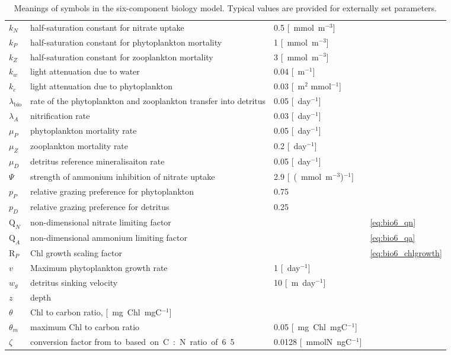 \begin{table}[ht]
\begin{tabular}{lp{8cm}p{5cm}l}
    $k_N$ & half-saturation constant for nitrate uptake & 0.5 \unit[mmol m$^{-3}$]  & \\
    $k_P$ & half-saturation constant for phytoplankton mortality & 1 \unit[mmol m$^{-3}$]  & \\
    $k_Z$ & half-saturation constant for zooplankton mortality & 3 \unit[mmol m$^{-3}$]  & \\
    $k_w$ & light attenuation due to water & 0.04 \unit[m$^{-1}$] & \\ 
    $k_c$ & light attenuation due to phytoplankton & 0.03 \unit[m$^2$ mmol$^{-1}$] & \\ 
    $\lambda_{\mathrm{bio}}$ & rate of the phytoplankton and zooplankton transfer into detritus & 0.05 \unit[day$^{-1}$]& \\
    $\lambda_A$ & nitrification rate  & 0.03 \unit[day$^{-1}$]& \\
    $\mu_P$ & phytoplankton mortality rate & 0.05 \unit[day$^{-1}$] & \\
    $\mu_Z$ & zooplankton mortality rate & 0.2 \unit[day$^{-1}$] & \\
    $\mu_D$ & detritus reference mineralisaiton rate & 0.05 \unit[day$^{-1}$] & \\
    $\Psi$ & strength of ammonium inhibition of nitrate uptake & 2.9 \unit[(mmol m$^{-3}$)$^{-1}$] & \\
    $p_P$ & relative grazing preference for phytoplankton & 0.75 & \\
    $p_D$ & relative grazing preference for detritus & 0.25 & \\
    $\mathrm{Q}_N$ & non-dimensional nitrate limiting factor && \eqref{eq:bio6_qn}  \\
    $\mathrm{Q}_A$ & non-dimensional ammonium limiting factor && \eqref{eq:bio6_qa}  \\
    $\mathrm{R}_P$ & Chl growth scaling factor && \eqref{eq:bio6_chlgrowth} \\
    $v$ & Maximum phytoplankton growth rate & 1 \unit[day$^{-1}$] & \\
    $w_g$ & detritus sinking velocity & 10 \unit[m day$^{-1}$]& \\
    $z$ & depth && \\
    $\theta$ & Chl to carbon ratio, \unit[mg Chl mgC$^{-1}$] && \\
    $\theta_m$ & maximum Chl to carbon ratio & 0.05 \unit[mg Chl mgC$^{-1}$] &\\
    $\zeta$ & conversion factor from \unit[gC] to \unit[mmolN] based on C:N ratio of 6.5 & 0.0128 \unit[mmolN ngC$^{-1}$] & \\
    \hline
  \end{tabular}
  \caption{Meanings of symbols in the six-component biology model. Typical values are
    provided for externally set parameters.}
  \label{tab:bioparameters6}
\end{table}

